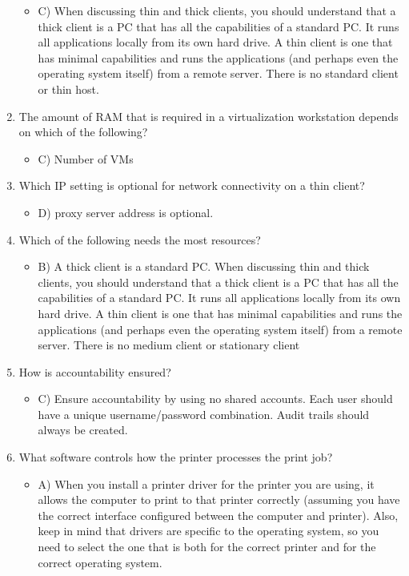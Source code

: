 \documentclass{article}
\begin{document}
\begin{enumerate}
\begin{itemize}
        \item C) When discussing thin and thick clients, you should understand that a thick client is a PC
that has all the capabilities of a standard PC. It runs all applications locally from its own hard
drive. A thin client is one that has minimal capabilities and runs the applications (and perhaps
even the operating system itself) from a remote server. There is no standard client or thin host.
    \end{itemize}
     \item The amount of RAM that is required in a virtualization workstation depends on which of
the following?
    \begin{itemize}
        \item C) Number of VMs
    \end{itemize}
     \item Which IP setting is optional for network connectivity on a thin client?
    \begin{itemize}
        \item D) proxy server address is optional.
    \end{itemize}
     \item Which of the following needs the most resources?
    \begin{itemize}
        \item B) A thick client is a standard PC. When discussing thin and thick clients, you should understand that a thick client is a PC that has all the capabilities of a standard PC. It runs all applications locally from its own hard drive. A thin client is one that has minimal capabilities and runs the applications (and perhaps even the operating system itself) from a remote server. There is no medium client or stationary client
    \end{itemize}
     \item How is accountability ensured?
    \begin{itemize}
        \item C) Ensure accountability by using no shared accounts. Each user should have a unique username/password combination. Audit trails should always be created.
    \end{itemize}
     \item What software controls how the printer processes the print job?
    \begin{itemize}
        \item A) When you install a printer driver for the printer you are using, it allows the computer to print to that printer correctly (assuming you have the correct interface configured between the computer and printer). Also, keep in mind that drivers are specific to the operating system, so you need to select the one that is both for the correct printer and for the correct operating system.

\end{itemize}
\end{enumerate}
\end{document}
